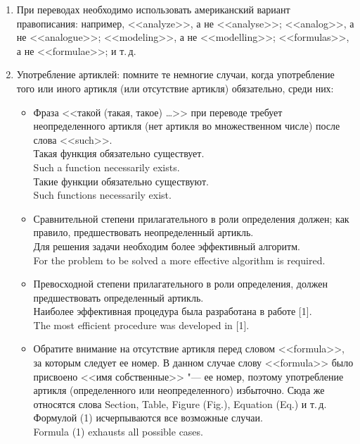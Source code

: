 \documentclass[a5paper, 10pt, twoside, numbers=enddot]{scrartcl}
\begin{document}
 
\begin{enumerate}
  \item	При переводах необходимо использовать американский вариант правописания: например, <<analyze>>, а не <<analyse>>; <<analog>>, а не <<analogue>>; <<modeling>>, а не <<modelling>>; <<formulas>>, а не <<formulae>>; и т.\,д.

  \item Употребление артиклей: помните те немногие случаи, когда употребление того или иного артикля (или отсутствие артикля) обязательно, среди них:
  \begin{itemize}   
    \item Фраза <<такой (такая, такое) \ldots>> при переводе требует неопределенного артикля (нет артикля во множественном числе) после слова <<such>>. \\ [4pt] \textsf{
	   Такая функция обязательно существует. \\ 
	   Such a function necessarily exists. \\ [4pt]
     Такие функции обязательно существуют. \\
     Such functions necessarily exist.}

   \item Сравнительной степени прилагательного в роли определения должен; как правило, предшествовать неопределенный артикль. \\ [4pt] \textsf{
     Для решения задачи необходим более эффективный алгоритм. \\
     For the problem to be solved a more effective algorithm is required.}
     
   \item Превосходной степени прилагательного в роли определения, должен предшествовать определенный артикль. \\ [3pt] \textsf{
     Наиболее эффективная процедура была разработана в работе [1]. \\
     The most efficient procedure was developed in [1].}

   \item Обратите внимание на отсутствие артикля перед словом <<formula>>, за которым следует ее номер. В данном случае слову <<formula>> было присвоено <<имя собственные>> "--- ее номер, поэтому употребление артикля (определенного или неопределенного) избыточно. Сюда же относятся слова Section, Table, Figure (Fig.), Equation (Eq.) и т.\,д. \\ [3pt] \textsf{
     Формулой (1) исчерпываются все возможные случаи. \\
     Formula (1) exhausts all possible cases.}
  

\end{itemize}
\end{enumerate}
\end{document}
